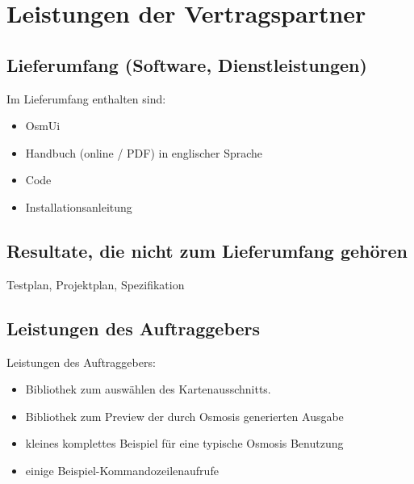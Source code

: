 \documentclass[a4paper,10pt]{scrartcl}
\begin{document}
\section{Leistungen der Vertragspartner}
\subsection{Lieferumfang (Software, Dienstleistungen)}
Im Lieferumfang enthalten sind:
\begin{itemize}
\item OsmUi
\item Handbuch (online / PDF) in englischer Sprache
\item Code
\item Installationsanleitung
\end{itemize}
\subsection{Resultate, die nicht zum Lieferumfang gehören}
Testplan, Projektplan, Spezifikation
\subsection{Leistungen des Auftraggebers}
Leistungen des Auftraggebers:
\begin{itemize}
\item Bibliothek zum auswählen des Kartenausschnitts.
\item Bibliothek zum Preview der durch Osmosis generierten Ausgabe
\item kleines komplettes Beispiel für eine typische Osmosis Benutzung
\item einige Beispiel-Kommandozeilenaufrufe
\end{itemize}
\end{document}
